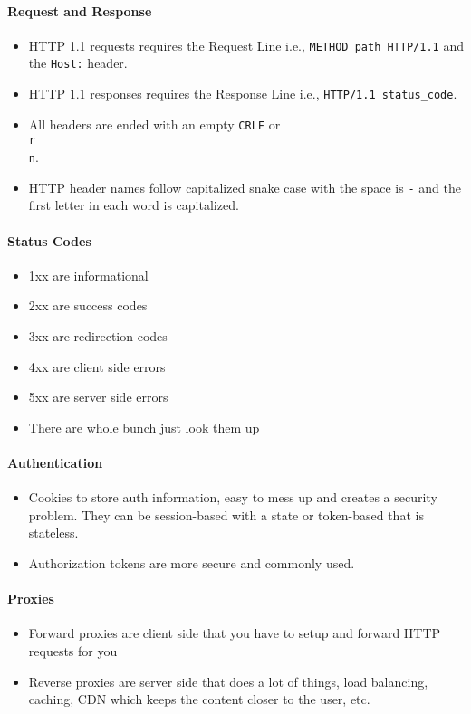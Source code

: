 \documentclass[../CMPUT-404-Notes.tex]{subfiles}
\begin{document}
\paragraph{Request and Response}
\begin{itemize}
  \item HTTP 1.1 requests requires the Request Line i.e., \texttt{METHOD path HTTP/1.1} and the \texttt{Host:} header.
  \item HTTP 1.1 responses requires the Response Line i.e., \texttt{HTTP/1.1 status\_code}.
  \item All headers are ended with an empty \texttt{CRLF} or \texttt{\\r\\n}.
  \item HTTP header names follow capitalized snake case with the space is \texttt{-} and the first letter in each word is capitalized.
\end{itemize}
\paragraph{Status Codes}
\begin{itemize}
  \item 1xx are informational
  \item 2xx are success codes
  \item 3xx are redirection codes 
  \item 4xx are client side errors 
  \item 5xx are server side errors 
  \item There are whole bunch just look them up
\end{itemize}
\paragraph{Authentication}
\begin{itemize}
  \item Cookies to store auth information, easy to mess up and creates a security problem. They can be session-based with a state or token-based that is stateless. 
  \item Authorization tokens are more secure and commonly used.
\end{itemize}
\paragraph{Proxies}
\begin{itemize}
  \item Forward proxies are client side that you have to setup and forward HTTP requests for you
  \item Reverse proxies are server side that does a lot of things, load balancing, caching, CDN which keeps the content closer to the user, etc. 
\end{itemize}
\end{document}
